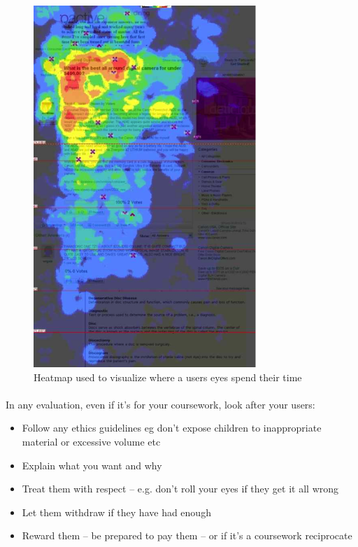\begin{figure}[H]
\centering
\includegraphics[width=0.75\textwidth]{images/heatmap}
\caption{Heatmap used to visualize where a users eyes spend their time}
\label{fig:heatmap}
\end{figure}

\paragraph{} In any evaluation, even if it’s for your coursework, look after your users:
\begin{itemize}
\item Follow any ethics guidelines eg don’t expose children to inappropriate material or excessive volume etc
\item Explain what you want and why
\item Treat them with respect – e.g. don’t roll your eyes if they get it all wrong
\item Let them withdraw if they have had enough
\item Reward them – be prepared to pay them – or if it’s a coursework reciprocate
\end{itemize}


